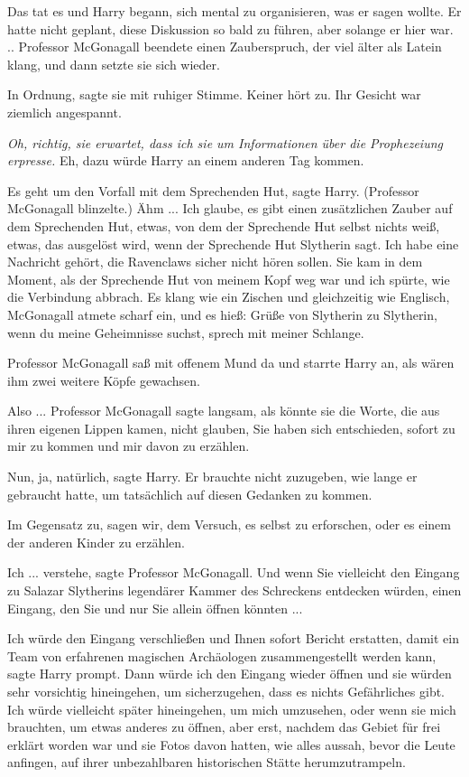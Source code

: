 Das tat es und Harry begann, sich mental zu organisieren, was er sagen wollte.
Er hatte nicht geplant, diese Diskussion so bald zu führen, aber solange er hier
war. .. Professor McGonagall beendete einen Zauberspruch, der viel älter als
Latein klang, und dann setzte sie sich wieder.

\glqq{}In Ordnung\grqq{}, sagte sie mit ruhiger Stimme. \glqq{}Keiner hört
zu.\grqq{} Ihr Gesicht war ziemlich angespannt.

\emph{Oh, richtig, sie erwartet, dass ich sie um Informationen über die
Prophezeiung erpresse.} Eh, dazu würde Harry an einem anderen Tag kommen.

\glqq{}Es geht um den Vorfall mit dem Sprechenden Hut\grqq{}, sagte Harry.
(Professor McGonagall blinzelte.) \glqq{}Ähm ... Ich glaube, es gibt einen
zusätzlichen Zauber auf dem Sprechenden Hut, etwas, von dem der Sprechende Hut
selbst nichts weiß, etwas, das ausgelöst wird, wenn der Sprechende Hut Slytherin
sagt. Ich habe eine Nachricht gehört, die Ravenclaws sicher nicht hören sollen.
Sie kam in dem Moment, als der Sprechende Hut von meinem Kopf weg war und ich
spürte, wie die Verbindung abbrach. Es klang wie ein Zischen und gleichzeitig
wie Englisch\grqq{}, McGonagall atmete scharf ein, \glqq{}und es hieß: Grüße von
Slytherin zu Slytherin, wenn du meine Geheimnisse suchst, sprech mit meiner
Schlange.\grqq{}

Professor McGonagall saß mit offenem Mund da und starrte Harry an, als wären ihm
zwei weitere Köpfe gewachsen.

\glqq{}Also ...\grqq{} Professor McGonagall sagte langsam, als könnte sie die
Worte, die aus ihren eigenen Lippen kamen, nicht glauben, \glqq{}Sie haben sich
entschieden, sofort zu mir zu kommen und mir davon zu erzählen.\grqq{}

\glqq{}Nun, ja, natürlich\grqq{}, sagte Harry. Er brauchte nicht zuzugeben, wie
lange er gebraucht hatte, um tatsächlich auf diesen Gedanken zu kommen.

\glqq{}Im Gegensatz zu, sagen wir, dem Versuch, es selbst zu erforschen, oder es
einem der anderen Kinder zu erzählen.\grqq{}

\glqq{}Ich ... verstehe\grqq{}, sagte Professor McGonagall. \glqq{}Und wenn Sie
vielleicht den Eingang zu Salazar Slytherins legendärer Kammer des Schreckens
entdecken würden, einen Eingang, den Sie und nur Sie allein öffnen
könnten ...\grqq{}

\glqq{}Ich würde den Eingang verschließen und Ihnen sofort Bericht erstatten,
damit ein Team von erfahrenen magischen Archäologen zusammengestellt werden
kann\grqq{}, sagte Harry prompt. \glqq{}Dann würde ich den Eingang wieder öffnen
und sie würden sehr vorsichtig hineingehen, um sicherzugehen, dass es nichts
Gefährliches gibt. Ich würde vielleicht später hineingehen, um mich umzusehen,
oder wenn sie mich brauchten, um etwas anderes zu öffnen, aber erst, nachdem das
Gebiet für frei erklärt worden war und sie Fotos davon hatten, wie alles aussah,
bevor die Leute anfingen, auf ihrer unbezahlbaren historischen Stätte
herumzutrampeln.\grqq{}

